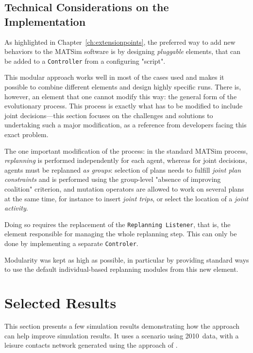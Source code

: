 {%
\subsection{Technical Considerations on the Implementation}
As highlighted in Chapter~\ref{ch:extensionpoints}, the preferred way to add new behaviors to the MATSim software is by designing \emph{pluggable} elements, that can be added to a \lstinline|Controller| from a configuring "script".

This modular approach works well in most of the cases used and makes it possible to combine different elements and design highly specific runs. There is, however, an element that one cannot modify this way: the general form of the evolutionary process. This process is exactly what has to be modified to include joint decisions---this section focuses on the challenges and solutions to undertaking such a major modification, as a reference from developers facing this exact problem.

The one important modification of the process: in the standard MATSim process, \emph{replanning} is performed independently for each agent, whereas for joint decisions, agents must be replanned \emph{as groups}: selection of plans needs to fulfill \emph{joint plan constraints} and is performed using the group-level "absence of improving coalition" criterion, and mutation operators are allowed to work on several plans at the same time, for instance to insert \emph{joint trips}, or select the location of a \emph{joint activity}.

Doing so requires the replacement of the \lstinline|Replanning Listener|, that is, the element responsible for managing the whole replanning step. This can only be done by implementing a separate \lstinline|Controler|. 

Modularity was kept as high as possible, in particular by providing standard ways to use the default individual-based replanning modules from this new element.

\section{Selected Results}
\label{sec:td:results}
This section presents a few simulation results demonstrating how the approach can help improve simulation results. It uses a scenario using 2010~data, with a leisure contacts network generated using the approach of \citet{ArentzeEtAl_SN_2013}.

}
